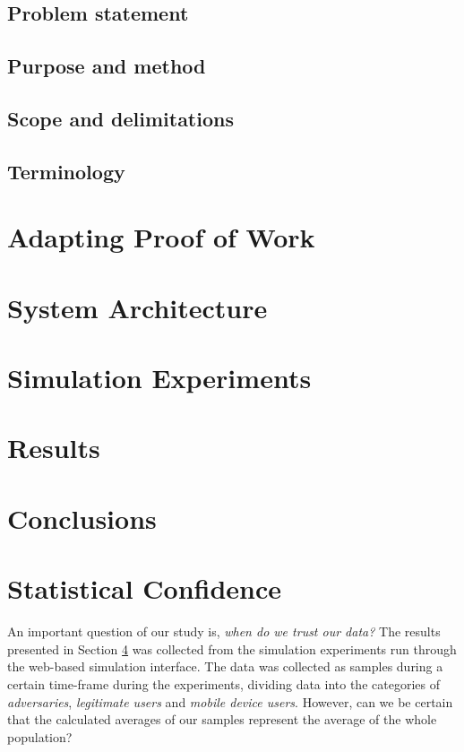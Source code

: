 \documentclass[a4paper,11pt]{kth-mag}
\begin{document}
\subsection*{Problem statement} %

\subsection*{Purpose and method}

\subsection*{Scope and delimitations}

\subsection*{Terminology}


\section{Adapting Proof of Work}

\newpage
\section{System Architecture}

\newpage
\section{Simulation Experiments}

\section{Results}\label{result}

\section{Conclusions}
 

\appendix
\appendixpage


\section{Statistical Confidence}\label{tab:confidence}
An important question of our study is, \emph{when do we trust our data?} The results presented in Section \ref{result} was collected from the simulation experiments run through the web-based simulation interface. The data was collected as samples during a certain time-frame during the experiments, dividing data into the categories of \emph{adversaries}, \emph{legitimate users} and \emph{mobile device users}. However,  can we be certain that the calculated averages of our samples represent the average of the whole population?
\end{document}
